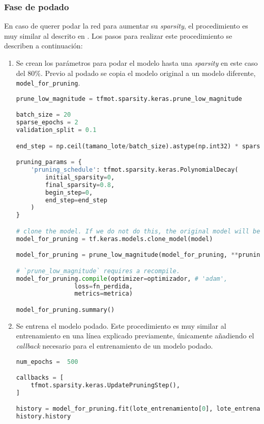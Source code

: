\subsubsection{Fase de podado}
\label{sssec:modelo_pruebas_fase_podado}
En caso de querer podar la red para aumentar su \textit{sparsity}, el procedimiento es muy similar al descrito en \cite{tensorflow_prune_model}. Los pasos para realizar este procedimiento se describen a continuación:
\begin{enumerate}
    \item Se crean los parámetros para podar el modelo hasta una \textit{sparsity} en este caso del 80\%. Previo al podado se copia el modelo original a un modelo diferente, \texttt{model\_for\_pruning}.\medskip
\begin{lstlisting}[language=Python]
prune_low_magnitude = tfmot.sparsity.keras.prune_low_magnitude

batch_size = 20
sparse_epochs = 2
validation_split = 0.1

end_step = np.ceil(tamano_lote/batch_size).astype(np.int32) * sparse_epochs

pruning_params = {
    'pruning_schedule': tfmot.sparsity.keras.PolynomialDecay(
        initial_sparsity=0,                                                    
        final_sparsity=0.8,
        begin_step=0,
        end_step=end_step
    )
}

# clone the model. If we do not do this, the original model will be altered too
model_for_pruning = tf.keras.models.clone_model(model)

model_for_pruning = prune_low_magnitude(model_for_pruning, **pruning_params)

# `prune_low_magnitude` requires a recompile.
model_for_pruning.compile(optimizer=optimizador, # 'adam',
                loss=fn_perdida,
                metrics=metrica)

model_for_pruning.summary()
\end{lstlisting}
    \item Se entrena el modelo podado. Este procedimiento es muy similar al entrenamiento en una línea explicado previamente, únicamente añadiendo el \textit{callback} necesario para el entrenamiento de un modelo podado.
\begin{lstlisting}[language=Python]
num_epochs =  500

callbacks = [
    tfmot.sparsity.keras.UpdatePruningStep(),
]

history = model_for_pruning.fit(lote_entrenamiento[0], lote_entrenamiento[1], batch_size=batch_size, epochs=num_epochs, validation_split=validation_split, callbacks=callbacks)
history.history
\end{lstlisting}
\end{enumerate}

